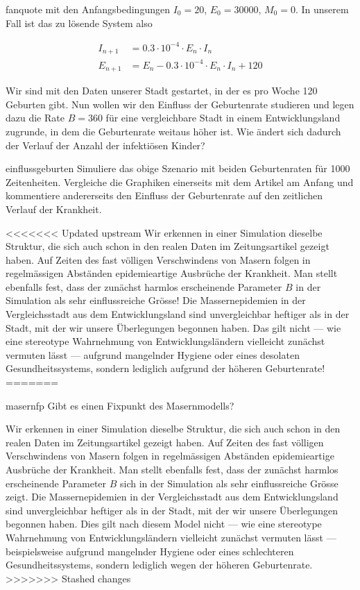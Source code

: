 \documentclass[%
<<<<<<< Updated upstream
<<<<<<< Updated upstream
11pt,%
twoside,%
titlepage,%
german,%
headsepline%
]{scrartcl}
\begin{document}
\begin{uebenv}{fanquote}
mit den Anfangsbedingungen $I_0=20$, $E_0=30000$, $M_0=0$. In unserem Fall ist das zu lösende System also

\begin{align*}
I_{n+1} &= 0.3\cdot10^{-4}\cdot E_n\cdot I_n\\
E_{n+1} &= E_n-0.3\cdot10^{-4}\cdot E_n\cdot I_n+120
\end{align*}

Wir sind mit den Daten unserer Stadt gestartet, in der es pro Woche 120 Geburten gibt. Nun wollen wir den Einfluss der Geburtenrate studieren und legen dazu die Rate $B=360$ für eine vergleichbare Stadt in einem Entwicklungsland zugrunde, in dem die Geburtenrate weitaus höher ist. Wie ändert sich dadurch der Verlauf der Anzahl der infektiösen Kinder?

\begin{uebenv}{einflussgeburten}
Simuliere das obige Szenario mit beiden Geburtenraten für 1000 Zeitenheiten. Vergleiche die Graphiken einerseits mit dem Artikel am Anfang und kommentiere andererseits den Einfluss der Geburtenrate auf den zeitlichen Verlauf der Krankheit.
\end{uebenv}

<<<<<<< Updated upstream
Wir erkennen in einer Simulation dieselbe Struktur, die sich auch schon in den realen Daten im Zeitungsartikel gezeigt haben. Auf Zeiten des fast völligen Verschwindens von Masern folgen in regelmässigen Abständen epidemieartige Ausbrüche der Krankheit. Man stellt ebenfalls fest, dass der zunächst harmlos erscheinende Parameter $B$ in der Simulation als sehr einflussreiche Grösse! Die Massernepidemien in der Vergleichsstadt aus dem Entwicklungsland sind unvergleichbar heftiger als in der Stadt, mit der wir unsere Überlegungen begonnen haben. Das gilt nicht --- wie eine stereotype Wahrnehmung von Entwicklungsländern vielleicht zunächst vermuten lässt --- aufgrund mangelnder Hygiene oder eines desolaten Gesundheitssystems, sondern lediglich aufgrund der höheren Geburtenrate!
=======
\begin{uebenv}{masernfp}
Gibt es einen Fixpunkt des Masernmodells?
\end{uebenv}

Wir erkennen in einer Simulation dieselbe Struktur, die sich auch schon in den realen Daten im Zeitungsartikel gezeigt haben. Auf Zeiten des fast völligen Verschwindens von Masern folgen in regelmässigen Abständen epidemieartige Ausbrüche der Krankheit. Man stellt ebenfalls fest, dass der zunächst harmlos erscheinende Parameter $B$ sich in der Simulation als sehr einflussreiche Grösse zeigt. Die Massernepidemien in der Vergleichsstadt aus dem Entwicklungsland sind unvergleichbar heftiger als in der Stadt, mit der wir unsere Überlegungen begonnen haben. Dies gilt nach diesem Model nicht --- wie eine stereotype Wahrnehmung von Entwicklungsländern vielleicht zunächst vermuten lässt --- beispielsweise aufgrund mangelnder Hygiene oder eines schlechteren Gesundheitssystems, sondern lediglich wegen der höheren Geburtenrate.
>>>>>>> Stashed changes


\end{uebenv}
\end{document}
